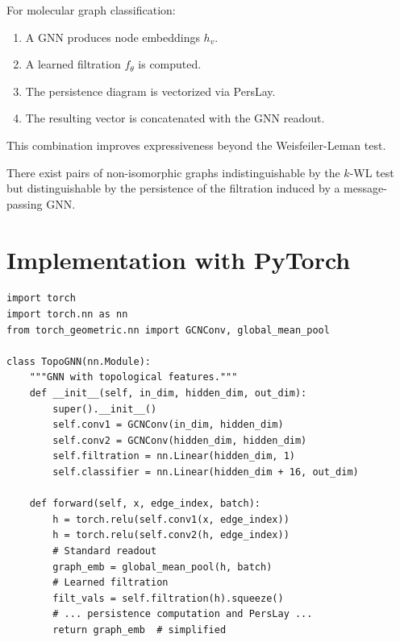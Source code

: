 \begin{example}
For molecular graph classification:
\begin{enumerate}
  \item A GNN produces node embeddings $h_v$.
  \item A learned filtration $f_\theta$ is computed.
  \item The persistence diagram is vectorized via PersLay.
  \item The resulting vector is concatenated with the GNN readout.
\end{enumerate}
This combination improves expressiveness beyond the Weisfeiler-Leman
test.
\end{example}

\begin{theorem}
There exist pairs of non-isomorphic graphs indistinguishable by
the $k$-WL test but distinguishable by the persistence of the
filtration induced by a message-passing GNN.
\end{theorem}

\section{Implementation with PyTorch}
\label{sec:implementation}

\begin{verbatim}
import torch
import torch.nn as nn
from torch_geometric.nn import GCNConv, global_mean_pool

class TopoGNN(nn.Module):
    """GNN with topological features."""
    def __init__(self, in_dim, hidden_dim, out_dim):
        super().__init__()
        self.conv1 = GCNConv(in_dim, hidden_dim)
        self.conv2 = GCNConv(hidden_dim, hidden_dim)
        self.filtration = nn.Linear(hidden_dim, 1)
        self.classifier = nn.Linear(hidden_dim + 16, out_dim)

    def forward(self, x, edge_index, batch):
        h = torch.relu(self.conv1(x, edge_index))
        h = torch.relu(self.conv2(h, edge_index))
        # Standard readout
        graph_emb = global_mean_pool(h, batch)
        # Learned filtration
        filt_vals = self.filtration(h).squeeze()
        # ... persistence computation and PersLay ...
        return graph_emb  # simplified
\end{verbatim}


